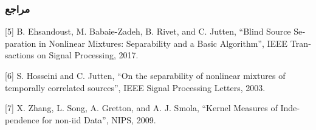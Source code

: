 \documentclass{beamer}
\begin{document}
\begin{frame}
\frametitle{مراجع}
\footnotesize{
	\begin{flushleft}
		
		\begin{latin}
			[5] B. Ehsandoust, M. Babaie-Zadeh, B. Rivet, and C. Jutten, “Blind
	Source Separation in Nonlinear Mixtures: Separability and a Basic Algorithm”, IEEE Transactions on Signal Processing, 2017.
			\vspace{0.5cm}
			
			
			[6] S. Hosseini and C. Jutten, “On the separability of nonlinear mixtures of temporally correlated sources”, IEEE Signal Processing
 	Letters,  2003.
			\vspace{0.5cm}
			
			[7] X. Zhang, L. Song, A. Gretton, and A. J. Smola, “Kernel Measures
 of Independence for non-iid Data”, NIPS, 2009.
			
			
			
		\end{latin}
	
\end{flushleft}
}
\end{frame}
\end{document}
